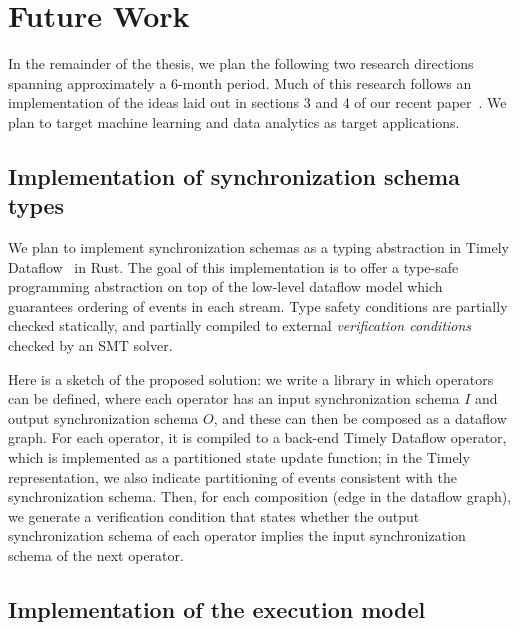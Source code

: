 \section{Future Work}
\label{sec:fw}


In the remainder of the thesis, we plan the following two research directions spanning approximately a 6-month period.
Much of this research follows an implementation of the ideas laid out in sections 3 and 4 of our recent paper~\cite{pods21}.
We plan to target machine learning and data analytics as target applications.

\subsection{Implementation of synchronization schema types}

We plan to implement synchronization schemas as a typing abstraction in Timely Dataflow~\cite{TimelyDataflow} in Rust.
The goal of this implementation is to offer a type-safe programming abstraction on top of the low-level dataflow model which guarantees ordering of events in each stream.
Type safety conditions are partially checked statically, and partially compiled
to external \emph{verification conditions} checked by an SMT solver.

Here is a sketch of the proposed solution:
we write a library in which operators can be defined, where each operator has an input synchronization schema $I$ and output synchronization schema $O$,
and these can then be composed as a dataflow graph.
For each operator, it is compiled to a back-end Timely Dataflow operator,
which is implemented as a partitioned state update function;
in the Timely representation, we also indicate partitioning of events consistent
with the synchronization schema.
Then, for each composition (edge in the dataflow graph),
we generate a verification condition that states whether the output synchronization schema of each operator implies the input synchronization schema of the next operator.

\subsection{Implementation of the execution model}

